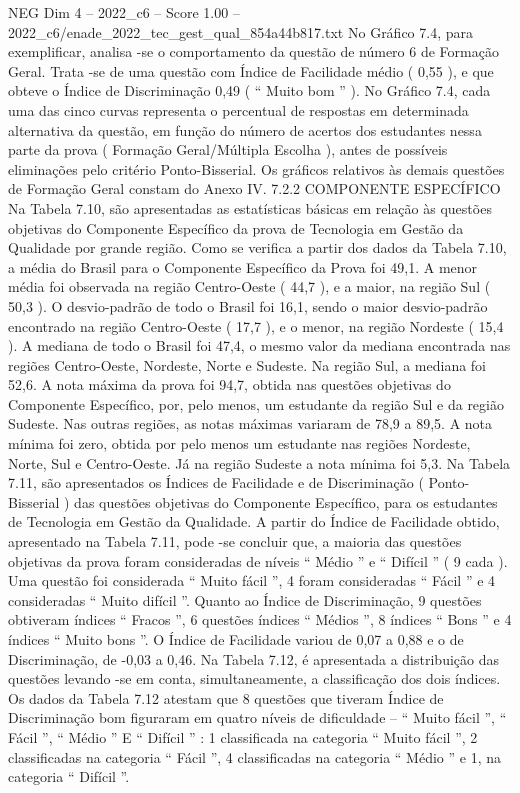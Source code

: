 \begin{textsample}{NEG Dim 4 – 2022\_c6 – Score 1.00 – 2022\_c6/enade\_2022\_tec\_gest\_qual\_854a44b817.txt}
No Gráfico 7.4, para exemplificar, analisa -se o comportamento da questão de número 6 de Formação Geral.
Trata -se de uma questão com Índice de Facilidade médio ( 0,55 ), e que obteve o Índice de Discriminação 0,49 ( “ Muito bom ” ).
No Gráfico 7.4, cada uma das cinco curvas representa o percentual de respostas em determinada alternativa da questão, em função do número de acertos dos estudantes nessa parte da prova ( Formação Geral/Múltipla Escolha ), antes de possíveis eliminações pelo critério Ponto-Bisserial.
Os gráficos relativos às demais questões de Formação Geral constam do Anexo IV. 7.2.2 COMPONENTE ESPECÍFICO Na Tabela 7.10, são apresentadas as estatísticas básicas em relação às questões objetivas do Componente Específico da prova de Tecnologia em Gestão da Qualidade por grande região.
Como se verifica a partir dos dados da Tabela 7.10, a média do Brasil para o Componente Específico da Prova foi 49,1.
A menor média foi observada na região Centro-Oeste ( 44,7 ), e a maior, na região Sul ( 50,3 ).
O desvio-padrão de todo o Brasil foi 16,1, sendo o maior desvio-padrão encontrado na região Centro-Oeste ( 17,7 ), e o menor, na região Nordeste ( 15,4 ).
A mediana de todo o Brasil foi 47,4, o mesmo valor da mediana encontrada nas regiões Centro-Oeste, Nordeste, Norte e Sudeste.
Na região Sul, a mediana foi 52,6.
A nota máxima da prova foi 94,7, obtida nas questões objetivas do Componente Específico, por, pelo menos, um estudante da região Sul e da região Sudeste.
Nas outras regiões, as notas máximas variaram de 78,9 a 89,5.
A nota mínima foi zero, obtida por pelo menos um estudante nas regiões Nordeste, Norte, Sul e Centro-Oeste.
Já na região Sudeste a nota mínima foi 5,3.
Na Tabela 7.11, são apresentados os Índices de Facilidade e de Discriminação ( Ponto-Bisserial ) das questões objetivas do Componente Específico, para os estudantes de Tecnologia em Gestão da Qualidade.
A partir do Índice de Facilidade obtido, apresentado na Tabela 7.11, pode -se concluir que, a maioria das questões objetivas da prova foram consideradas de níveis “ Médio ” e “ Difícil ” ( 9 cada ).
Uma questão foi considerada “ Muito fácil ”, 4 foram consideradas “ Fácil ” e 4 consideradas “ Muito difícil ”.
Quanto ao Índice de Discriminação, 9 questões obtiveram índices “ Fracos ”, 6 questões índices “ Médios ”, 8 índices “ Bons ” e 4 índices “ Muito bons ”.
O Índice de Facilidade variou de 0,07 a 0,88 e o de Discriminação, de -0,03 a 0,46.
Na Tabela 7.12, é apresentada a distribuição das questões levando -se em conta, simultaneamente, a classificação dos dois índices.
Os dados da Tabela 7.12 atestam que 8 questões que tiveram Índice de Discriminação bom figuraram em quatro níveis de dificuldade – “ Muito fácil ”, “ Fácil ”, “ Médio ” E “ Difícil ” : 1 classificada na categoria “ Muito fácil ”, 2 classificadas na categoria “ Fácil ”, 4 classificadas na categoria “ Médio ” e 1, na categoria “ Difícil ”.

\end{textsample}
